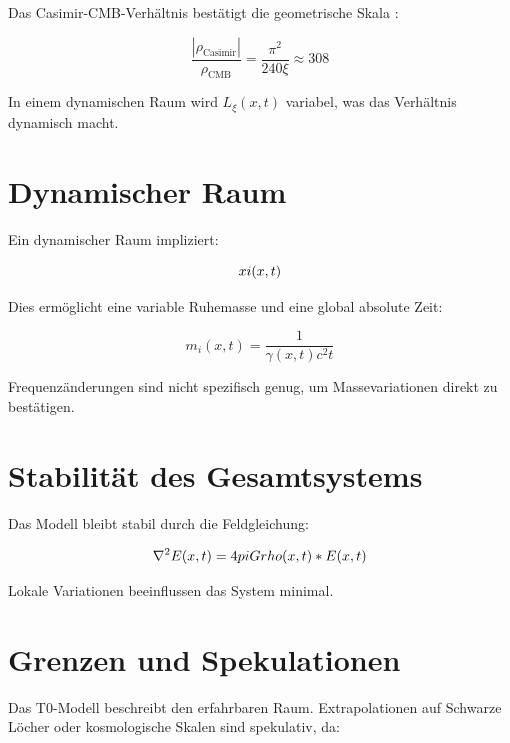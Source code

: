 \documentclass[12pt,a4paper]{report}
\begin{document}
Das Casimir-CMB-Verhältnis bestätigt die geometrische Skala \cite{Casimir1948, Planck2018}:

\begin{equation}
	\frac{|\rho_{\text{Casimir}}|}{\rho_{\text{CMB}}} = \frac{\pi^2}{240 \xi} \approx 308
	\label{eq:casimir_cmb_verhaeltnis}
\end{equation}

In einem dynamischen Raum wird \(L_\xi(x,t)\) variabel, was das Verhältnis dynamisch macht.

\section{Dynamischer Raum}
\label{sec:dynamischer_raum}

Ein dynamischer Raum impliziert:

\begin{equation}
	xi(x,t)
	\label{eq:xi_dynamisch}
\end{equation}

Dies ermöglicht eine variable Ruhemasse und eine global absolute Zeit:

\begin{equation}
	m_i(x,t) = \frac{1}{\gamma(x,t) c^2 t}
	\label{eq:masse_zeit_relation}
\end{equation}

Frequenzänderungen sind nicht spezifisch genug, um Massevariationen direkt zu bestätigen.

\section{Stabilität des Gesamtsystems}
\label{sec:stabilitaet}

Das Modell bleibt stabil durch die Feldgleichung:

\begin{equation}
	\nabla^2 E(x,t) = 4pi G rho(x,t) * E(x,t)
	\label{eq:feldgleichung}
\end{equation}

Lokale Variationen beeinflussen das System minimal.

\section{Grenzen und Spekulationen}
\label{sec:grenzen}

Das T0-Modell beschreibt den erfahrbaren Raum. Extrapolationen auf Schwarze Löcher oder kosmologische Skalen sind spekulativ, da:
\end{document}
